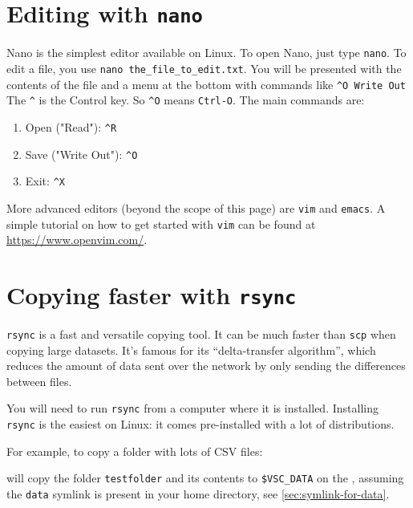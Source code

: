 \section{Editing with \texttt{nano}}

Nano is the simplest editor available on Linux. To open Nano, just type
\lstinline|nano|. To edit a file, you use \lstinline|nano the_file_to_edit.txt|. You will
be presented with the contents of the file and a menu at the bottom with
commands like \lstinline|^O Write Out| The \lstinline|^| is the Control key. So \lstinline|^O| means
\lstinline|Ctrl-O|. The main commands are:

\begin{enumerate}
\item Open ("Read"): \lstinline|^R|
\item Save ("Write Out"): \lstinline|^O|
\item Exit: \lstinline|^X|
\end{enumerate}

More advanced editors (beyond the scope of this page) are \lstinline|vim| and \lstinline|emacs|.
A simple tutorial on how to get started with \lstinline|vim| can be found at \url{https://www.openvim.com/}.

\section{Copying faster with \texttt{rsync}}
\hypertarget{sec:rsync}{}

\lstinline|rsync| is a fast and versatile copying tool. It can be much faster than \lstinline|scp|
when copying large datasets. It's famous for its ``delta-transfer algorithm'', which
reduces the amount of data sent over the network by only sending the differences between
files.

You will need to run \lstinline|rsync| from a computer where it is installed. Installing
\lstinline|rsync| is the easiest on Linux: it comes pre-installed with a lot of distributions.

For example, to copy a folder with lots of CSV files:

\begin{prompt}
\end{prompt}

will copy the folder \lstinline|testfolder| and its contents to \lstinline|$VSC_DATA| on
the \hpc, assuming the \lstinline|data| symlink is present in your home directory,
see \autoref{sec:symlink-for-data}.

